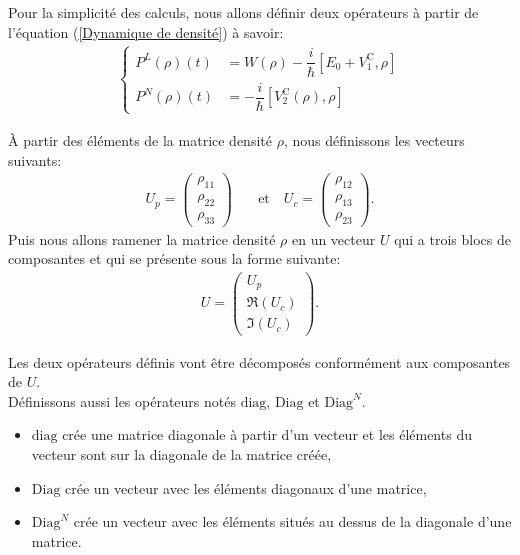 \documentclass[12pt,a4paper,openany,oneside]{book}
\begin{document}
{{{{{{Pour la simplicité des calculs, nous allons définir deux opérateurs à partir de  l'équation (\ref{Dynamique de densité}) à savoir:
\begin{eqnarray*}
 \left\{
 \begin{split}
 P^{L}(\rho)(t) & =  W(\rho)-\dfrac{i}{\hbar}[E_{0}+V_{1}^{\textrm{C}},\rho] \\
 P^{N}(\rho)(t) & = - \dfrac{i}{\hbar}[V_{2}^{\textrm{C}}(\rho),\rho]  
  \end{split}  
   \right.   
  \end{eqnarray*}
  
À partir des éléments de la matrice densité $ \rho $, nous définissons les vecteurs suivants:
\begin{eqnarray*}
 U_{p} = \begin{pmatrix}\rho_{11}\\ \rho_{22}\\ \rho_{33}\end{pmatrix} &
 \quad \textrm{et} \quad U_{c} = \begin{pmatrix}\rho_{12}\\ \rho_{13}\\ \rho_{23}\end{pmatrix}. 
\end{eqnarray*}
Puis nous allons ramener la matrice densité $ \rho $ en un vecteur $ U $ qui a trois blocs de composantes et qui se présente sous la forme suivante:
\begin{eqnarray}\label{vecteurs colonnes}
U = \begin{pmatrix}U_{p}\\ \Re(U_{c})\\ \Im(U_{c})\end{pmatrix}.
\end{eqnarray}

Les deux opérateurs définis vont être décomposés conformément aux composantes de $ U $.\\
Définissons aussi les opérateurs notés $ \textrm{diag} $, $ \textrm{Diag} $ et $ \textrm{Diag}^{N} $.
\begin{itemize}
\item $ \textrm{diag} $ crée une matrice diagonale à partir d'un vecteur et les éléments du vecteur sont sur la diagonale de la matrice créée,
\item  $ \textrm{Diag} $  crée un vecteur avec les éléments diagonaux d'une matrice,
\item $ \textrm{Diag}^{N} $ crée un vecteur avec les éléments situés au dessus de la diagonale d'une matrice.
\end{itemize}

}}}}}}
\end{document}
